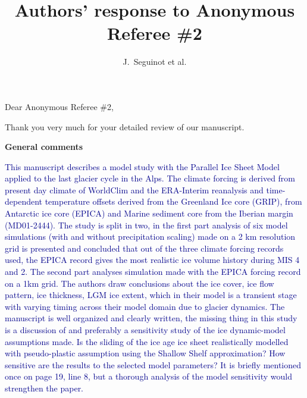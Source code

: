

\title{Authors' response to Anonymous Referee \#2}
\author{J.~Seguinot et al.}


\maketitle
\bigskip


\newcommand{\sechead}[1]{\bigskip\noindent\textbf{#1}}
\newcommand{\referee}[1]{\bigskip\noindent\textcolor{darkblue}{#1}}
\newcommand{\msquote}[1]{\begin{quote}\textit{#1}\end{quote}}
\newcommand{\doi}[1]{doi:\allowbreak\href{http://dx.doi.org/#1}{#1}}

Dear Anonymous Referee \#2,

Thank you very much for your detailed review of our manuscript.




\sechead{General comments}

    \referee{%
        This manuscript describes a model study with the Parallel Ice Sheet
        Model applied to the last glacier cycle in the Alps. The climate
        forcing is derived from present day climate of WorldClim and the
        ERA-Interim reanalysis and time-dependent temperature offsets derived
        from the Greenland Ice core (GRIP), from Antarctic ice core (EPICA) and
        Marine sediment core from the Iberian margin (MD01-2444). The study is
        split in two, in the first part analysis of six model simulations (with
        and without precipitation scaling) made on a 2 km resolution grid is
        presented and concluded that out of the three climate forcing records
        used, the EPICA record gives the most realistic ice volume history
        during MIS 4 and 2. The second part analyses simulation made with the
        EPICA forcing record on a 1km grid. The authors draw conclusions about
        the ice cover, ice flow pattern, ice thickness, LGM ice extent, which
        in their model is a transient stage with varying timing across their
        model domain due to glacier dynamics. The manuscript is well organized
        and clearly written, the missing thing in this study is a discussion of
        and preferably a sensitivity study of the ice dynamic-model assumptions
        made. Is the sliding of the ice age ice sheet realistically modelled
        with pseudo-plastic assumption using the Shallow Shelf approximation?
        How sensitive are the results to the selected model parameters? It is
        briefly mentioned once on page 19, line 8, but a thorough analysis of
        the model sensitivity would strengthen the paper.}

